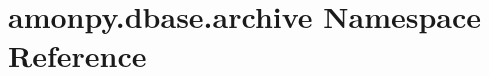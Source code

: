 \hypertarget{namespaceamonpy_1_1dbase_1_1archive}{\section{amonpy.\-dbase.\-archive Namespace Reference}
\label{namespaceamonpy_1_1dbase_1_1archive}
}
